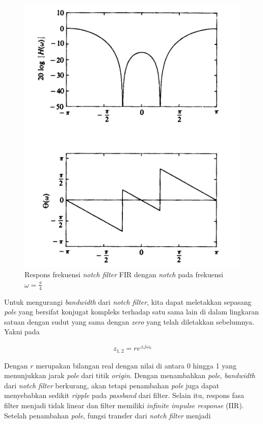 \documentclass[11pt]{article}
\begin{document}
\begin{figure}[H]
\centerline{\includegraphics[scale=0.4]{figures/fig7-notchfreqresp.png}}
\caption{Respons frekuensi \textit{notch filter} FIR dengan \textit{notch} pada frekuensi $\omega = \frac{\pi}{4}$}
\end{figure}

Untuk mengurangi \textit{bandwidth} dari \textit{notch filter}, kita dapat meletakkan sepasang \textit{pole} yang bersifat konjugat kompleks terhadap satu sama lain di dalam lingkaran satuan dengan sudut yang sama dengan \textit{zero} yang telah diletakkan sebelumnya. Yakni pada

\begin{equation}
    z_{1,2} = r e^{\pm j \omega_0}
\end{equation}

Dengan $r$ merupakan bilangan real dengan nilai di antara 0 hingga 1 yang menunjukkan jarak \textit{pole} dari titik \textit{origin}. Dengan menambahkan \textit{pole}, \textit{bandwidth} dari \textit{notch filter} berkurang, akan tetapi penambahan \textit{pole} juga dapat menyebabkan sedikit \textit{ripple} pada \textit{passband} dari filter. Selain itu, respons fasa filter menjadi tidak linear dan filter memiliki \textit{infinite impulse response} (IIR). Setelah penambahan \textit{pole}, fungsi transfer dari \textit{notch filter} menjadi
\end{document}
